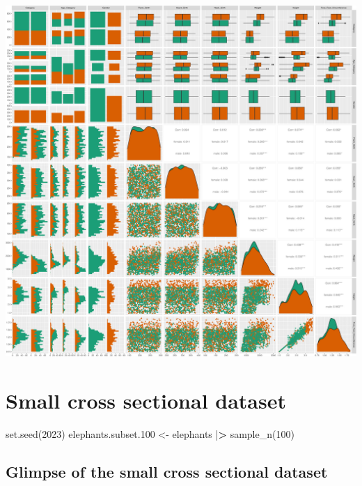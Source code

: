\documentclass[
]{book}
\newenvironment{Shaded}{\begin{snugshade}}{\end{snugshade}}
\newcommand{\DecValTok}[1]{\textcolor[rgb]{0.00,0.00,0.81}{#1}}
\newcommand{\ErrorTok}[1]{\textcolor[rgb]{0.64,0.00,0.00}{\textbf{#1}}}
\newcommand{\FloatTok}[1]{\textcolor[rgb]{0.00,0.00,0.81}{#1}}
\newcommand{\FunctionTok}[1]{\textcolor[rgb]{0.00,0.00,0.00}{#1}}
\newcommand{\NormalTok}[1]{#1}
\newcommand{\OtherTok}[1]{\textcolor[rgb]{0.56,0.35,0.01}{#1}}
\newcommand{\SpecialCharTok}[1]{\textcolor[rgb]{0.00,0.00,0.00}{#1}}
\begin{document}
\includegraphics{Data-Visualisation-geom-Encyclopedia_files/figure-latex/unnamed-chunk-9-1.pdf}

\hypertarget{small-cross-sectional-dataset}{%
\section{Small cross sectional dataset}\label{small-cross-sectional-dataset}}

\begin{Shaded}
\begin{Highlighting}[]
\FunctionTok{set.seed}\NormalTok{(}\DecValTok{2023}\NormalTok{)}
\NormalTok{elephants.subset}\FloatTok{.100} \OtherTok{\textless{}{-}}\NormalTok{ elephants }\SpecialCharTok{|}\ErrorTok{\textgreater{}} \FunctionTok{sample\_n}\NormalTok{(}\DecValTok{100}\NormalTok{)}
\end{Highlighting}
\end{Shaded}

\hypertarget{glimpse-of-the-small-cross-sectional-dataset}{%
\subsection{Glimpse of the small cross sectional dataset}\label{glimpse-of-the-small-cross-sectional-dataset}}
\end{document}
